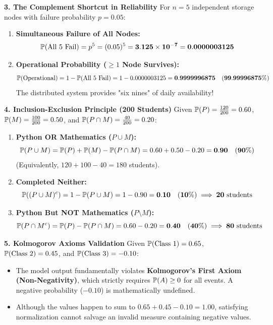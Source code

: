 \textbf{3. The Complement Shortcut in Reliability}
For $n = 5$ independent storage nodes with failure probability $p = 0.05$:
\begin{enumerate}
    \item \textbf{Simultaneous Failure of All Nodes:}
    $$\P(\text{All 5 Fail}) = p^5 = (0.05)^5 = \mathbf{3.125 \times 10^{-7} = 0.0000003125}$$
    \item \textbf{Operational Probability ($\ge 1$ Node Survives):}
    $$\P(\text{Operational}) = 1 - \P(\text{All 5 Fail}) = 1 - 0.0000003125 = \mathbf{0.9999996875 \quad (99.99996875\%)}$$
    The distributed system provides "six nines" of daily availability!
\end{enumerate}

\textbf{4. Inclusion-Exclusion Principle (200 Students)}
Given $\P(P) = \frac{120}{200} = 0.60$, $\P(M) = \frac{100}{200} = 0.50$, and $\P(P \cap M) = \frac{40}{200} = 0.20$:
\begin{enumerate}
    \item \textbf{Python OR Mathematics ($P \cup M$):}
    $$\P(P \cup M) = \P(P) + \P(M) - \P(P \cap M) = 0.60 + 0.50 - 0.20 = \mathbf{0.90 \quad (90\%)}$$
    (Equivalently, $120 + 100 - 40 = 180$ students).
    \item \textbf{Completed Neither:}
    $$\P((P \cup M)^c) = 1 - \P(P \cup M) = 1 - 0.90 = \mathbf{0.10 \quad (10\%) \implies 20 \text{ students}}$$
    \item \textbf{Python But NOT Mathematics ($P \setminus M$):}
    $$\P(P \cap M^c) = \P(P) - \P(P \cap M) = 0.60 - 0.20 = \mathbf{0.40 \quad (40\%) \implies 80 \text{ students}}$$
\end{enumerate}

\textbf{5. Kolmogorov Axioms Validation}
Given $\P(\text{Class 1}) = 0.65$, $\P(\text{Class 2}) = 0.45$, and $\P(\text{Class 3}) = -0.10$:
\begin{itemize}
    \item The model output fundamentally violates \textbf{Kolmogorov's First Axiom (Non-Negativity)}, which strictly requires $\P(A) \ge 0$ for all events. A negative probability ($-0.10$) is mathematically undefined.
    \item Although the values happen to sum to $0.65 + 0.45 - 0.10 = 1.00$, satisfying normalization cannot salvage an invalid measure containing negative values.
\end{itemize}

